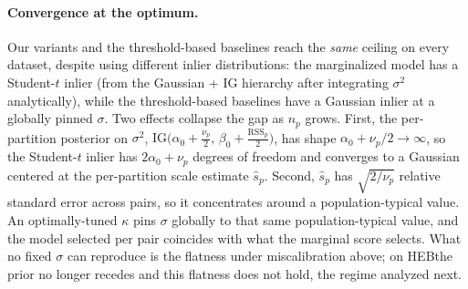 \documentclass{article}
\newcommand{\mname}[1]{\texorpdfstring{#1\xspace}{#1}}
\newcommand{\heb}{\mname{HEB}}
\begin{document}
\paragraph{Convergence at the optimum.}
Our variants and the threshold-based baselines reach
the \emph{same} ceiling on every dataset, despite using
different inlier distributions: the marginalized model has a
Student-$t$ inlier (from the Gaussian + IG hierarchy after
integrating $\sigma^2$ analytically), while the
threshold-based baselines have a Gaussian inlier at a
globally pinned $\sigma$.  Two effects
collapse the gap as $n_p$ grows.  First, the per-partition
posterior on $\sigma^2$,
$\mathrm{IG}\!\bigl(\alpha_0 + \tfrac{\nu_p}{2},\,
	\beta_0 + \tfrac{\mathrm{RSS}_p}{2}\bigr)$, has shape
$\alpha_0 + \nu_p/2 \to \infty$, so the Student-$t$ inlier has
$2\alpha_0 + \nu_p$ degrees of freedom and converges to a
Gaussian centered at the per-partition scale estimate
$\hat s_p$.  Second, $\hat s_p$ has $\sqrt{2/\nu_p}$ relative
standard error across pairs, so it concentrates around a
population-typical value.  An optimally-tuned $\kappa$ pins
$\sigma$ globally to that same population-typical value, and
the model selected per pair coincides with what the marginal
score selects.  What no fixed $\sigma$ can reproduce is the
flatness under miscalibration above; on \heb the prior no longer
recedes and this flatness does not hold, the regime analyzed
next.
\end{document}
